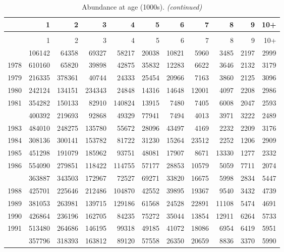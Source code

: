 \documentclass[
]{article}
\begin{document}
\begin{longtable}[t]{lrrrrrrrrrr}
\caption{\label{tab:NAA-table}Abundance at age (1000s).}\\
\toprule
  & 1 & 2 & 3 & 4 & 5 & 6 & 7 & 8 & 9 & 10+\\
\midrule
\endfirsthead
\caption[]{Abundance at age (1000s). \textit{(continued)}}\\
\toprule
  & 1 & 2 & 3 & 4 & 5 & 6 & 7 & 8 & 9 & 10+\\
\midrule
\endhead

\endfoot
\bottomrule
\endlastfoot
1977 & 106142 & 64358 & 69327 & 58217 & 20038 & 10821 & 5960 & 3485 & 2197 & 2999\\
1978 & 610160 & 65820 & 39898 & 42875 & 35832 & 12283 & 6622 & 3646 & 2132 & 3179\\
1979 & 216335 & 378361 & 40744 & 24333 & 25454 & 20966 & 7163 & 3860 & 2125 & 3096\\
1980 & 242124 & 134151 & 234343 & 24848 & 14316 & 14648 & 12001 & 4097 & 2208 & 2986\\
1981 & 354282 & 150133 & 82910 & 140824 & 13915 & 7480 & 7405 & 6008 & 2047 & 2593\\
\addlinespace
1982 & 400392 & 219693 & 92868 & 49329 & 77941 & 7494 & 4013 & 3971 & 3222 & 2489\\
1983 & 484010 & 248275 & 135780 & 55672 & 28096 & 43497 & 4169 & 2232 & 2209 & 3176\\
1984 & 308136 & 300141 & 153782 & 81722 & 31230 & 15264 & 23512 & 2252 & 1206 & 2909\\
1985 & 451298 & 191079 & 185962 & 93751 & 48081 & 17907 & 8671 & 13330 & 1277 & 2332\\
1986 & 554090 & 279851 & 118422 & 114755 & 57177 & 28853 & 10579 & 5059 & 7711 & 2074\\
\addlinespace
1987 & 363887 & 343503 & 172967 & 72527 & 69271 & 33820 & 16675 & 5998 & 2834 & 5447\\
1988 & 425701 & 225646 & 212486 & 104870 & 42552 & 39895 & 19367 & 9540 & 3432 & 4739\\
1989 & 381053 & 263981 & 139715 & 129186 & 61568 & 24528 & 22891 & 11108 & 5474 & 4691\\
1990 & 426864 & 236196 & 162705 & 84235 & 75272 & 35044 & 13854 & 12911 & 6264 & 5733\\
1991 & 513480 & 264686 & 146195 & 99318 & 49185 & 41072 & 18086 & 6954 & 6419 & 5951\\
\addlinespace
1992 & 357796 & 318393 & 163812 & 89120 & 57558 & 26350 & 20659 & 8836 & 3370 & 5990\\

\end{longtable}
\end{document}
